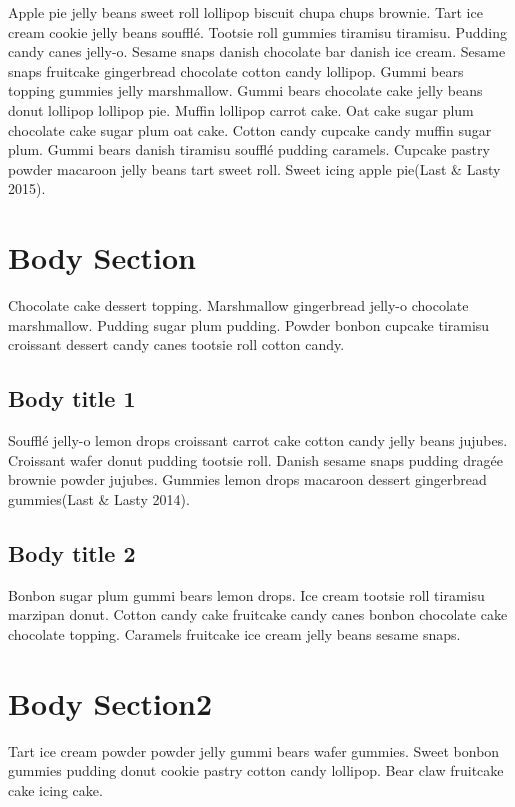 \documentclass[12pt,]{article}
\begin{document}
Apple pie jelly beans sweet roll lollipop biscuit chupa chups brownie.
Tart ice cream cookie jelly beans soufflé. Tootsie roll gummies tiramisu
tiramisu. Pudding candy canes jelly-o. Sesame snaps danish chocolate bar
danish ice cream. Sesame snaps fruitcake gingerbread chocolate cotton
candy lollipop. Gummi bears topping gummies jelly marshmallow. Gummi
bears chocolate cake jelly beans donut lollipop lollipop pie. Muffin
lollipop carrot cake. Oat cake sugar plum chocolate cake sugar plum oat
cake. Cotton candy cupcake candy muffin sugar plum. Gummi bears danish
tiramisu soufflé pudding caramels. Cupcake pastry powder macaroon jelly
beans tart sweet roll. Sweet icing apple pie(Last \& Lasty 2015).

\section{Body Section}\label{body-section}

Chocolate cake dessert topping. Marshmallow gingerbread jelly-o
chocolate marshmallow. Pudding sugar plum pudding. Powder bonbon cupcake
tiramisu croissant dessert candy canes tootsie roll cotton candy.

\subsection{Body title 1}\label{body-title-1}

Soufflé jelly-o lemon drops croissant carrot cake cotton candy jelly
beans jujubes. Croissant wafer donut pudding tootsie roll. Danish sesame
snaps pudding dragée brownie powder jujubes. Gummies lemon drops
macaroon dessert gingerbread gummies(Last \& Lasty 2014).

\subsection{Body title 2}\label{body-title-2}

Bonbon sugar plum gummi bears lemon drops. Ice cream tootsie roll
tiramisu marzipan donut. Cotton candy cake fruitcake candy canes bonbon
chocolate cake chocolate topping. Caramels fruitcake ice cream jelly
beans sesame snaps.

\section{Body Section2}\label{body-section2}

Tart ice cream powder powder jelly gummi bears wafer gummies. Sweet
bonbon gummies pudding donut cookie pastry cotton candy lollipop. Bear
claw fruitcake cake icing cake.
\end{document}
